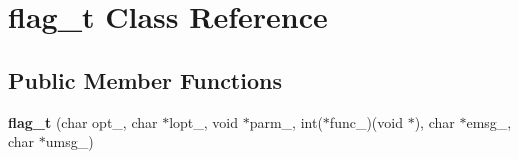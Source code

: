 \hypertarget{classflag__t}{\section{flag\-\_\-t Class Reference}
\label{classflag__t}
}
\subsection*{Public Member Functions}
\begin{DoxyCompactItemize}
\item 
\hypertarget{classflag__t_a0fb866dc289c51d3cf31f8d2cc60c428}{{\bfseries flag\-\_\-t} (char opt\-\_\-, char $\ast$lopt\-\_\-, void $\ast$parm\-\_\-, int($\ast$func\-\_\-)(void $\ast$), char $\ast$emsg\-\_\-, char $\ast$umsg\-\_\-)}\label{classflag__t_a0fb866dc289c51d3cf31f8d2cc60c428}

\end{DoxyCompactItemize}
